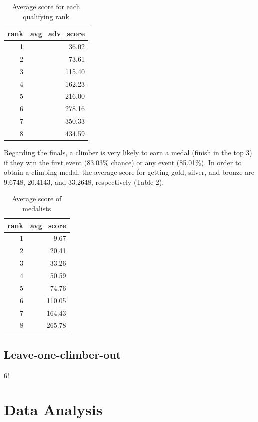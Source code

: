 \documentclass[12pt]{article}
\begin{document}
\begin{table}[ht]
\centering
\caption{Average score for each qualifying rank} 
\begin{tabular}{rr}
  \hline
rank & avg\_adv\_score \\ 
  \hline
  1 & 36.02 \\ 
    2 & 73.61 \\ 
    3 & 115.40 \\ 
    4 & 162.23 \\ 
    5 & 216.00 \\ 
    6 & 278.16 \\ 
    7 & 350.33 \\ 
    8 & 434.59 \\ 
   \hline
\end{tabular}
\end{table}

Regarding the finals, a climber is very likely to earn a medal (finish
in the top 3) if they win the first event (83.03\% chance) or any event
(85.01\%). In order to obtain a climbing medal, the average score for
getting gold, silver, and bronze are 9.6748, 20.4143, and 33.2648,
respectively (Table 2).

\begin{table}[ht]
\centering
\caption{Average score of medalists} 
\begin{tabular}{rr}
  \hline
rank & avg\_score \\ 
  \hline
  1 & 9.67 \\ 
    2 & 20.41 \\ 
    3 & 33.26 \\ 
    4 & 50.59 \\ 
    5 & 74.76 \\ 
    6 & 110.05 \\ 
    7 & 164.43 \\ 
    8 & 265.78 \\ 
   \hline
\end{tabular}
\end{table}

\hypertarget{leave-one-climber-out}{%
\subsection{Leave-one-climber-out}\label{leave-one-climber-out}}

6!

\hypertarget{data-analysis}{%
\section{Data Analysis}\label{data-analysis}}
\end{document}
